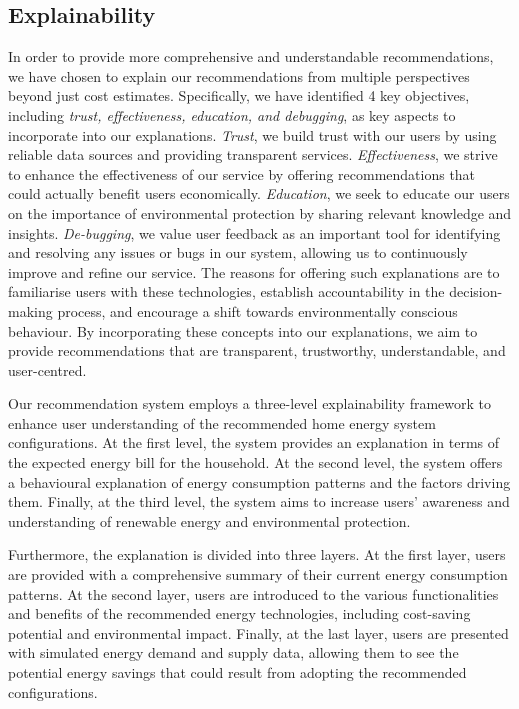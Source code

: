 \subsection{Explainability}

In order to provide more comprehensive and understandable recommendations, we have chosen to explain our recommendations from multiple perspectives beyond just cost estimates. 
Specifically, we have identified 4 key objectives, including \emph{trust, effectiveness, education, and debugging}, as key aspects to incorporate into our explanations. 
\emph{Trust}, we build trust with our users by using reliable data sources and providing transparent services. 
\emph{Effectiveness}, we strive to enhance the effectiveness of our service by offering recommendations that could actually benefit users economically. 
\emph{Education}, we seek to educate our users on the importance of environmental protection by sharing relevant knowledge and insights. 
\emph{De-bugging}, we value user feedback as an important tool for identifying and resolving any issues or bugs in our system, allowing us to continuously improve and refine our service.
The reasons for offering such explanations are to familiarise users with these technologies, establish accountability in the decision-making process, and encourage a shift towards environmentally conscious behaviour.
By incorporating these concepts into our explanations, we aim to provide recommendations that are transparent, trustworthy, understandable, and user-centred. 

Our recommendation system employs a three-level explainability framework to enhance user understanding of the recommended home energy system configurations. 
At the first level, the system provides an explanation in terms of the expected energy bill for the household. 
At the second level, the system offers a behavioural explanation of energy consumption patterns and the factors driving them. 
Finally, at the third level, the system aims to increase users' awareness and understanding of renewable energy and environmental protection.

Furthermore, the explanation is divided into three layers. 
At the first layer, users are provided with a comprehensive summary of their current energy consumption patterns. 
At the second layer, users are introduced to the various functionalities and benefits of the recommended energy technologies, including cost-saving potential and environmental impact. 
Finally, at the last layer, users are presented with simulated energy demand and supply data, allowing them to see the potential energy savings that could result from adopting the recommended configurations. 

